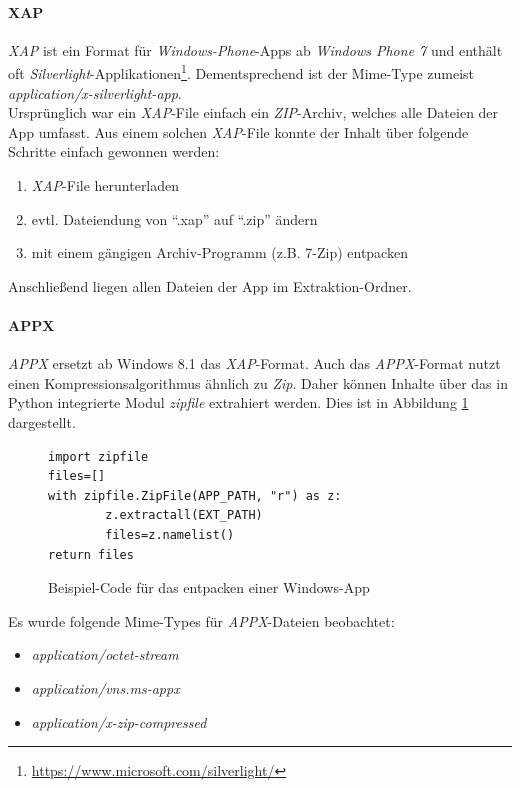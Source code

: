 \paragraph{XAP}
\textit{XAP} ist ein Format für \textit{Windows-Phone}-Apps ab \textit{Windows Phone 7} und enthält oft \textit{Silverlight}-Applikationen\footnote{\url{https://www.microsoft.com/silverlight/}}. Dementsprechend ist der Mime-Type zumeist \textit{application/x-silverlight-app}.\\

Ursprünglich war ein \textit{XAP}-File einfach ein \textit{ZIP}-Archiv, welches alle Dateien der App umfasst. Aus einem solchen \textit{XAP}-File konnte der Inhalt über folgende Schritte einfach gewonnen werden:
\begin{enumerate}
	\item \textit{XAP}-File herunterladen
	\item evtl. Dateiendung von "`.xap"' auf "`.zip"' ändern
	\item mit einem gängigen Archiv-Programm (z.B. 7-Zip) entpacken
\end{enumerate}
Anschließend liegen allen Dateien der App im Extraktion-Ordner.\\

\paragraph{APPX}
\textit{APPX} ersetzt ab Windows 8.1 das \textit{XAP}-Format. Auch das \textit{APPX}-Format nutzt einen Kompressionsalgorithmus ähnlich zu \textit{Zip}. Daher können Inhalte über das in Python integrierte Modul \textit{zipfile} extrahiert werden. Dies ist in Abbildung \ref{lst:WeitMobSFWinAPPXExtract} dargestellt.\\

\begin{figure}
\begin{lstlisting}
import zipfile
files=[]
with zipfile.ZipFile(APP_PATH, "r") as z:
        z.extractall(EXT_PATH)
        files=z.namelist()
return files
\end{lstlisting}
\caption{Beispiel-Code für das entpacken einer Windows-App}
\label{lst:WeitMobSFWinAPPXExtract}
\end{figure}

Es wurde folgende Mime-Types für \textit{APPX}-Dateien beobachtet:
\begin{itemize}
    \item \textit{application/octet-stream}
    \item \textit{application/vns.ms-appx}
    \item \textit{application/x-zip-compressed}
\end{itemize}

